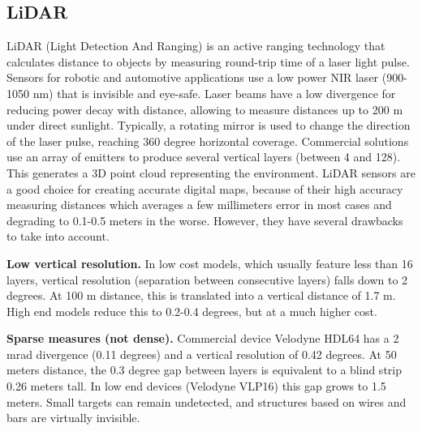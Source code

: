 \documentclass[journal]{IEEEtran}
\begin{document}


\subsection{LiDAR}
\label{sec:02-c-lidar}
LiDAR (Light Detection And Ranging) is an active ranging technology that 
calculates distance to objects by measuring round-trip time of a laser light 
pulse.
Sensors for robotic and automotive applications use a low power 
NIR laser (900-1050 nm) that is invisible and eye-safe. 
Laser beams have a low divergence for reducing power decay with distance,
allowing to measure distances up to 200 m under direct sunlight.
Typically, a rotating mirror is used to change the direction of the laser 
pulse, reaching 360 degree horizontal coverage. 
Commercial solutions use an array of 
emitters to produce several vertical layers (between 4 and 128). This generates
a 3D point cloud representing the environment.
LiDAR sensors are a good choice for creating accurate digital maps, because
of their high accuracy measuring distances which averages
a few millimeters error in most cases and degrading to 0.1-0.5 meters in the 
worse. %
However, they have several drawbacks to take into account.

\textbf{Low vertical resolution.} In low cost models, which usually feature 
less than 16 layers, vertical resolution (separation between consecutive
layers) falls down to 2 degrees. At 100 m distance, this is translated into 
a vertical distance of 1.7 m. High end models reduce this to 0.2-0.4 
degrees, but at a much higher cost.

\textbf{Sparse measures (not dense).} 
Commercial device Velodyne HDL64 has a 2 mrad divergence \cite{Glennie2010} 
(0.11 degrees) and a vertical resolution of 0.42 degrees. At 50 meters 
distance, the 0.3 degree gap between layers is equivalent to a blind strip
0.26 meters tall. In low end devices (Velodyne VLP16) this gap grows to 1.5
meters. Small targets can remain undetected, and structures based on
wires and bars are virtually invisible.
\end{document}
